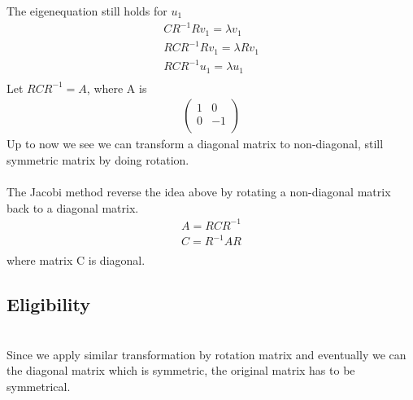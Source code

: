 \documentclass[a4paper]{article}
\begin{document}
The eigenequation still holds for $u_1$
\begin{align*}
	C R^{-1} R v_1 = \lambda v_1 \\
	R C R^{-1} R v_1 = \lambda R v_1 \\
	R C R^{-1} u_1 = \lambda  u_1 \\
\end{align*}
Let $R C R^{-1} = A $, where A is
\begin{align*}
	\left( \begin{array}{cc}	
		1 & 0\\
		0 & -1\\
\end{array} \right)
\end{align*}
Up to now we see we can transform a diagonal matrix to non-diagonal, still symmetric matrix by doing rotation. \\
\\
The Jacobi method reverse the idea above by rotating a non-diagonal matrix back to a diagonal matrix. 
\begin{align*}
	A = R C R^{-1} \\
	C = R^{-1} A R \\
\end{align*}
where matrix C is diagonal.\\
\subsection{Eligibility}\\
Since we apply similar transformation by rotation matrix and eventually we can the diagonal matrix which is symmetric, the original matrix has to be symmetrical.\\
\end{document}
